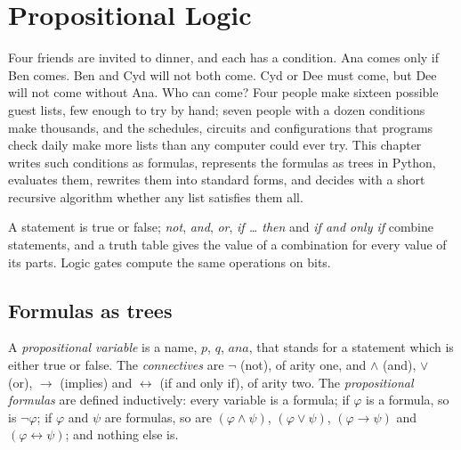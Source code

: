 \chapter{Propositional Logic}\label{ch:b1:propositional-logic}

Four friends are invited to dinner, and each has a condition. Ana comes only if Ben comes. Ben and Cyd will not both
come. Cyd or Dee must come, but Dee will not come without Ana. Who can come? Four people make sixteen possible
guest lists, few enough to try by hand; seven people with a dozen conditions make thousands, and the schedules,
circuits and configurations that programs check daily make more lists than any computer could ever try. This chapter
writes such conditions as formulas, represents the formulas as trees in Python, evaluates them, rewrites them into
standard forms, and decides with a short recursive algorithm whether any list satisfies them all.

\begin{recall}
A statement is true or false; \emph{not}, \emph{and}, \emph{or}, \emph{if \dots{} then} and \emph{if and only if}
combine statements, and a truth table gives the value of a combination for every value of its parts. Logic gates
compute the same operations on bits.
\end{recall}

\section{Formulas as trees}\label{sec:b1:propositional-logic:formulas}

\begin{definition}\label{def:b1:propositional-logic:formula}
A \emph{propositional variable} is a name, $p$, $q$, $\mathit{ana}$, that stands for a
statement which is either true or false. The \emph{connectives} are $\neg$ (not), of arity one, and
$\wedge$ (and), $\vee$ (or), $\rightarrow$ (implies) and $\leftrightarrow$ (if and only if), of arity two. The
\emph{propositional formulas} are defined inductively: every variable is a formula; if
$\varphi$ is a formula, so is $\neg\varphi$; if $\varphi$ and $\psi$ are formulas, so are $(\varphi \wedge \psi)$,
$(\varphi \vee \psi)$, $(\varphi \rightarrow \psi)$ and $(\varphi \leftrightarrow \psi)$; and nothing else is.
\end{definition}

